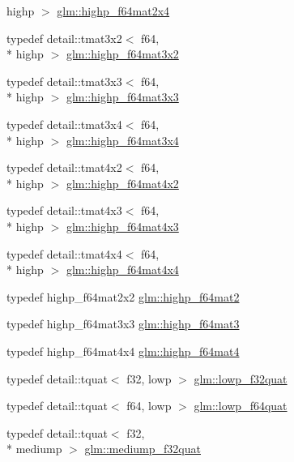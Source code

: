 \begin{DoxyCompactItemize}
highp $>$ \hyperlink{group__gtc__type__precision_ga72fae79e6633cbc6bf691f69278b36d3}{glm\-::highp\-\_\-f64mat2x4}
\item 
typedef detail\-::tmat3x2$<$ f64, \\*
highp $>$ \hyperlink{group__gtc__type__precision_ga5cdc9d6fb9ce07e5485c4e2db919ce7e}{glm\-::highp\-\_\-f64mat3x2}
\item 
typedef detail\-::tmat3x3$<$ f64, \\*
highp $>$ \hyperlink{group__gtc__type__precision_gaf520a9307867c632408029a53af3e375}{glm\-::highp\-\_\-f64mat3x3}
\item 
typedef detail\-::tmat3x4$<$ f64, \\*
highp $>$ \hyperlink{group__gtc__type__precision_ga4144f547189dd7e52b4dd282f41a1cd1}{glm\-::highp\-\_\-f64mat3x4}
\item 
typedef detail\-::tmat4x2$<$ f64, \\*
highp $>$ \hyperlink{group__gtc__type__precision_gabe9bc3680e7d83a7b34297da518a8117}{glm\-::highp\-\_\-f64mat4x2}
\item 
typedef detail\-::tmat4x3$<$ f64, \\*
highp $>$ \hyperlink{group__gtc__type__precision_ga0264562b4667b8073b7708efc2280691}{glm\-::highp\-\_\-f64mat4x3}
\item 
typedef detail\-::tmat4x4$<$ f64, \\*
highp $>$ \hyperlink{group__gtc__type__precision_gaa95b52552df369b75d09155ebb29b1bd}{glm\-::highp\-\_\-f64mat4x4}
\item 
typedef highp\-\_\-f64mat2x2 \hyperlink{group__gtc__type__precision_ga7d9fd446fd43310ba6f63c8f9468acc0}{glm\-::highp\-\_\-f64mat2}
\item 
typedef highp\-\_\-f64mat3x3 \hyperlink{group__gtc__type__precision_ga00c5743b0eba6b437422571f4eda27b8}{glm\-::highp\-\_\-f64mat3}
\item 
typedef highp\-\_\-f64mat4x4 \hyperlink{group__gtc__type__precision_ga1ac5d0564721a22765c68c54a0a4f87a}{glm\-::highp\-\_\-f64mat4}
\item 
typedef detail\-::tquat$<$ f32, lowp $>$ \hyperlink{group__gtc__type__precision_ga83edc5f21bfa41f72f881b29aabbd919}{glm\-::lowp\-\_\-f32quat}
\item 
typedef detail\-::tquat$<$ f64, lowp $>$ \hyperlink{group__gtc__type__precision_ga225e6f95dd6a7049b1a86db23b90cbac}{glm\-::lowp\-\_\-f64quat}
\item 
typedef detail\-::tquat$<$ f32, \\*
mediump $>$ \hyperlink{group__gtc__type__precision_gab038e3482ca401bca2b2634c96f44f09}{glm\-::mediump\-\_\-f32quat}

\end{DoxyCompactItemize}
